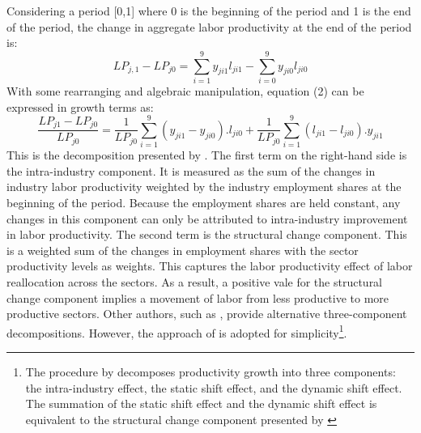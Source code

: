 Considering a period [0,1] where 0 is the beginning of the period and 1 is the end of the period, the change in aggregate labor productivity at the end of the period is:
\begin{equation}
    LP_{j,1}-LP_{j0}=\sum_{i=1}^9 y_{ji1}l_{ji1} - \sum_{i=0} ^9 y_{ji0} l_{ji0}
    \label{prodgr}
\end{equation}
With some rearranging and algebraic manipulation, equation (2) can be expressed in growth terms as:
\begin{equation}
    \frac{LP_{j1}- LP_{j0}}{LP_{j0}}= \frac{1}{LP_{j0}}\sum_{i=1}^9(y_{ji1}-y_{ji0}). l_{ji0} + \frac{1}{LP_{j0}} \sum_{i=1}^9 (l_{ji1}-l_{ji0}).y_{ji1}
    \label{mac}
\end{equation}
This is the decomposition presented by \cite{mcmillan2011making}. The first term on the right-hand side is the intra-industry component. It is measured as the sum of the changes in industry labor productivity weighted by the industry employment shares at the beginning of the period. Because the employment shares are held constant, any changes in this component can only be attributed to intra-industry improvement in labor productivity. The second term is the structural change component. This is a weighted sum of the changes in employment shares with the sector productivity levels as weights. This captures the labor productivity effect of labor reallocation across the sectors. As a result, a positive vale for the structural change component implies a movement of labor from less productive to more productive sectors. Other authors, such as  \cite{timmer2000productivity}, provide alternative three-component decompositions. However, the approach of \cite{mcmillan2011making} is adopted for simplicity\footnote{The procedure by \cite{timmer2000productivity} decomposes productivity growth into three components: the intra-industry effect, the static shift effect, and the dynamic shift effect. The summation of the static shift effect and the dynamic shift effect is equivalent to the structural change component presented by \cite{mcmillan2011making}}. 